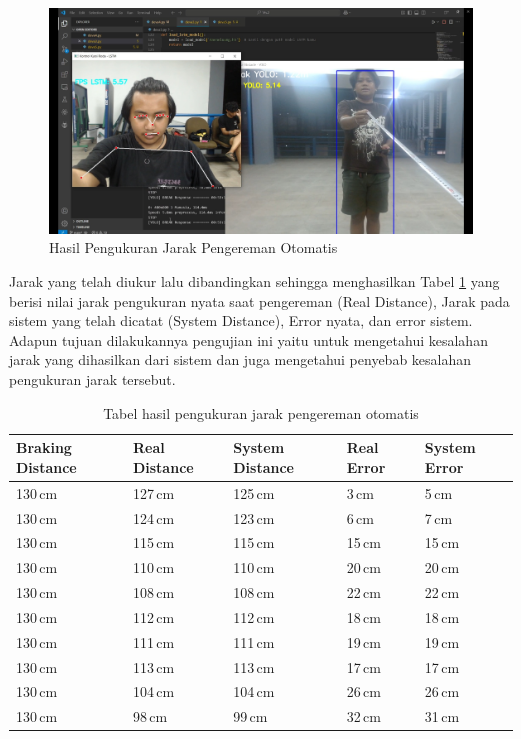 \begin{figure} [H] 
  \centering
  \includegraphics[scale=0.3]{gambar/pengujianjarakdeva.jpg}
  \caption{Hasil Pengukuran Jarak Pengereman Otomatis}
  \label{fig:FotoPengambilanakurasi}
\end{figure}

Jarak yang telah diukur lalu dibandingkan sehingga menghasilkan Tabel \ref{tb:akurasijarak} yang berisi nilai jarak pengukuran nyata saat pengereman (Real Distance), Jarak pada sistem yang telah dicatat (System Distance), Error nyata, dan error sistem. Adapun tujuan dilakukannya pengujian ini yaitu untuk mengetahui kesalahan jarak yang dihasilkan dari sistem dan juga mengetahui penyebab kesalahan pengukuran jarak tersebut.

\begin{table}[H]
  \centering
  \caption{Tabel hasil pengukuran jarak pengereman otomatis}
  \label{tb:akurasijarak}
  \begin{tabular}{|l|l|l|l|l|}
  \hline
  Braking Distance & Real Distance & System Distance & Real Error & System Error \\ \hline
  130\,cm          & 127\,cm        & 125\,cm          & 3\,cm      & 5\,cm        \\ \hline
  130\,cm          & 124\,cm        & 123\,cm          & 6\,cm      & 7\,cm        \\ \hline
  130\,cm          & 115\,cm        & 115\,cm          & 15\,cm     & 15\,cm       \\ \hline
  130\,cm          & 110\,cm        & 110\,cm          & 20\,cm     & 20\,cm       \\ \hline
  130\,cm          & 108\,cm        & 108\,cm          & 22\,cm     & 22\,cm       \\ \hline
  130\,cm          & 112\,cm        & 112\,cm          & 18\,cm     & 18\,cm       \\ \hline
  130\,cm          & 111\,cm        & 111\,cm          & 19\,cm     & 19\,cm       \\ \hline
  130\,cm          & 113\,cm        & 113\,cm          & 17\,cm     & 17\,cm       \\ \hline
  130\,cm          & 104\,cm        & 104\,cm          & 26\,cm     & 26\,cm       \\ \hline
  130\,cm          & 98\,cm         & 99\,cm           & 32\,cm     & 31\,cm       \\ \hline
  \end{tabular}
\end{table}


